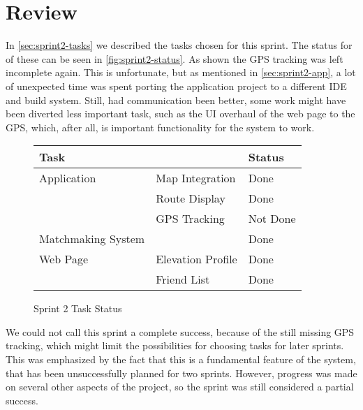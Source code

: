 \section{Review}
\label{sec:sprint2-review}

In \autoref{sec:sprint2-tasks} we described the tasks chosen for this sprint. The status for of these can be seen in \autoref{fig:sprint2-status}. As shown the \ac{GPS} tracking was left incomplete again. This is unfortunate, but as mentioned in \autoref{sec:sprint2-app}, a lot of unexpected time was spent porting the application project to a different \ac{IDE} and build system. Still, had communication been better, some work might have been diverted less important task, such as the \ac{UI} overhaul of the web page to the \ac{GPS}, which, after all, is important functionality for the system to work.

\begin{figure}[ht!]
 \caption{Sprint 2 Task Status}
 \label{fig:sprint2-status}
 \begin{tabular}{|l l|l|}
  \hline
  \textbf{Task} && \textbf{Status} \\
  \hline
  Application & Map Integration & Done \\
   & Route Display & Done \\
   & \ac{GPS} Tracking & Not Done \\
  \hline
  Matchmaking System && Done \\
  \hline
  Web Page & Elevation Profile & Done \\
   & Friend List & Done \\
  \hline
 \end{tabular}
\end{figure}

We could not call this sprint a complete success, because of the still missing \ac{GPS} tracking, which might limit the possibilities for choosing tasks for later sprints. This was emphasized by the fact that this is a fundamental feature of the system, that has been unsuccessfully planned for two sprints. However, progress was made on several other aspects of the project, so the sprint was still considered a partial success.
